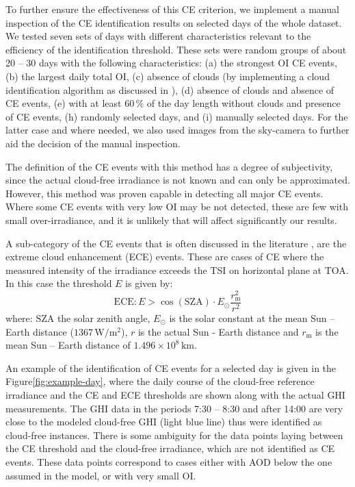 \documentclass[preprint, 5p,
authoryear]{elsarticle} %
\begin{document}
To further ensure the effectiveness of this CE criterion, we implement a
manual inspection of the CE identification results on selected days of
the whole dataset. We tested seven sets of days with different
characteristics relevant to the efficiency of the identification
threshold. These sets were random groups of about 20 -- 30 days with the
following characteristics: (a) the strongest OI CE events, (b) the
largest daily total OI, (c) absence of clouds (by implementing a cloud
identification algorithm as discussed in \citet{Natsis2023}), (d)
absence of clouds and absence of CE events, (e) with at least \(60\,\%\)
of the day length without clouds and presence of CE events, (h) randomly
selected days, and (i) manually selected days. For the latter case and
where needed, we also used images from the sky-camera to further aid the
decision of the manual inspection.

The definition of the CE events with this method has a degree of
subjectivity, since the actual cloud-free irradiance is not known and
can only be approximated. However, this method was proven capable in
detecting all major CE events. Where some CE events with very low OI may
be not detected, these are few with small over-irradiance, and it is
unlikely that will affect significantly our results.

A sub-category of the CE events that is often discussed in the
literature \citep{Cordero2023, Martins2022, Yordanov2015}, are the
extreme cloud enhancement (ECE) events. These are cases of CE where the
measured intensity of the irradiance exceeds the TSI on horizontal plane
at TOA. In this case the threshold \(E\) is given by: \begin{equation}
\text{ECE}: E > \cos(\text{SZA}) \cdot E_{\odot} \frac{r^2_\text{m}} {r^2}
\label{eq:ECE}
\end{equation} where: \(\text{SZA}\) the solar zenith angle,
\(E_{\odot}\) is the solar constant at the mean Sun -- Earth distance
(\(1367\,\text{W}/\text{m}^2\)), \(r\) is the actual Sun - Earth
distance and \(r_\text{m}\) is the mean Sun -- Earth distance of
\(1.496\times10^8\,\text{km}\).

An example of the identification of CE events for a selected day is
given in the Figure\nobreakspace{}\ref{fig:example-day}, where the daily
course of the cloud-free reference irradiance and the CE and ECE
thresholds are shown along with the actual GHI measurements. The GHI
data in the periods 7:30 -- 8:30 and after 14:00 are very close to the
modeled cloud-free GHI (light blue line) thus were identified as
cloud-free instances. There is some ambiguity for the data points laying
between the CE threshold and the cloud-free irradiance, which are not
identified as CE events. These data points correspond to cases either
with AOD below the one assumed in the model, or with very small OI.
\end{document}
